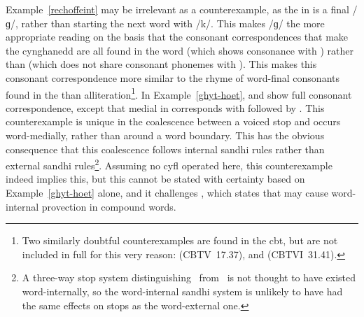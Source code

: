 Example~\ref{rechoffeint}  may be irrelevant as a counterexample, as the  in  is a final /ɡ/, rather than starting the next word with /k/. This makes /ɡ/  the more appropriate reading on the basis that the consonant correspondences that make the cynghanedd are all found in the word  (which shows consonance with ) rather than  (which does not share consonant phonemes with ). This makes this consonant correspondence more similar to the rhyme of word-final consonants found in the  than alliteration\footnote{Two similarly doubtful counterexamples are found in the \gls{cbt}, but are not included in full for this very reason:  (\acrshort{CBTV}~17.37), and  (\acrshort{CBTVI}~31.41).}. 
In Example~\ref{ghyt-hoet},  and  show full consonant correspondence, except that medial  in  corresponds with  followed by . This counterexample is unique in the coalescence between a voiced stop and  occurs word-medially, rather than around a word boundary. This has the obvious consequence that this coalescence follows internal sandhi rules rather than external sandhi rules\footnote{A three-way stop system distinguishing \xD\ from \lT\ is not thought to have existed word-internally, so the word-internal sandhi system is unlikely to have had the same effects on stops as the word-external one.}.  Assuming no \gls{cyfl} operated here, this counterexample indeed implies this, but this cannot be stated with certainty based on Example~\ref{ghyt-hoet} alone, and it challenges \textcite[§~17b]{evans_grammar_1964}, which states that  may cause word-internal provection in compound words. %


